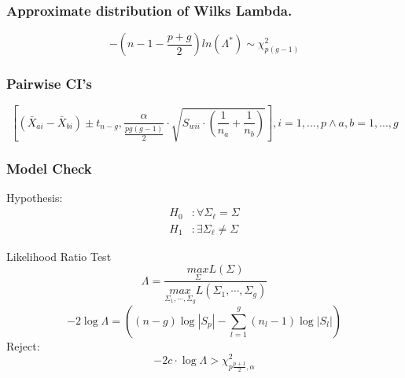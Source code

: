 \documentclass[aspectratio=169,10pt,t]{beamer}
\begin{document}
\begin{frame}[t]
	\frametitle{Approximate distribution of Wilks Lambda.}
	\[
		-\left(n-1-\frac{p+g}{2}\right)ln\left( \Lambda^*\right) \sim \chi^2_{p(g-1)}
	\]  
\end{frame}

\begin{frame}[t]
	\frametitle{Pairwise CI's}
	\[
		\left[
			( \bar{X}_{ai} - \bar{X}_{bi}  ) 
			\pm t_{n-g},
			\frac{\alpha}{ \frac{pg(g-1)}{2} } \cdot 
			\sqrt{S_{wii} \cdot \left(  \frac{1}{n_a} + \frac{1}{n_b}  \right) }
	\right] , i = 1,...,p \land a,b = 1,...,g
	\] 

	\begin{figure}[H]
		\vspace{-0.5cm}
		\scalebox{0.6}{
		
	}
	\end{figure}
\end{frame}


\begin{frame}[t]
	\frametitle{Model Check}
	Hypothesis:
	\[
		\begin{aligned}
			H_0 &: \forall \Sigma_\ell = \Sigma\\
			H_1 &: \exists \Sigma_\ell \neq \Sigma
		\end{aligned}
	\] 

	Likelihood Ratio Test
	\[
		\Lambda = \frac{\underset{\Sigma}{max}L(\Sigma)}{\underset{\Sigma_1,\cdots,\Sigma_g}{max}L(\Sigma_1,\cdots,\Sigma_g)} 
	\] 
	\[
		-2\log\Lambda =  \left((n-g)\log|S_p| - \sum^{g}_{l=1}(n_l - 1) \log|S_l| \right) 
	\]
	Reject:
	\[
		-2c \cdot \log\Lambda > \chi^2_{p \frac{p+1}{2}, \alpha}
	\] 

\end{frame}
\end{document}
